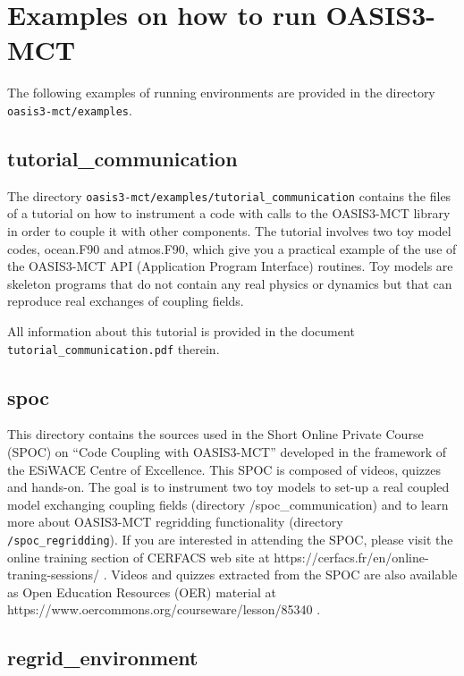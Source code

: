 \section{Examples on how to run OASIS3-MCT}
\label{subsec_running}

The following examples of running environments are provided in the directory {\tt oasis3-mct/examples}.

\subsection{tutorial\_communication}
\label{subsec_tutorial}

The directory  {\tt oasis3-mct/examples/tutorial\_communication}
contains the files of a tutorial on how to instrument a code with calls to the OASIS3-MCT library in order to couple it with other components. The tutorial involves two toy model codes, ocean.F90 and atmos.F90, which give you a practical example of the use of the OASIS3-MCT API (Application Program Interface) routines. Toy models are skeleton programs that do not contain any real physics or dynamics but that can reproduce real exchanges of coupling fields.

All information about this tutorial is
provided in the document {\tt tutorial\_communication.pdf} therein. 

\subsection{spoc}
\label{subsec_spoc}

This directory contains the sources used in the Short Online Private
Course (SPOC) on “Code Coupling with OASIS3-MCT” developed in the
framework of the ESiWACE Centre of Excellence. This SPOC is composed
of videos, quizzes and hands-on. The goal is to instrument two toy
models to set-up a real coupled model exchanging coupling fields (directory
  /spoc\_communication) and to learn more about OASIS3-MCT regridding
functionality (directory {\tt /spoc\_regridding}). If you are interested in
attending the SPOC, please visit the online training section of
CERFACS web site at https://cerfacs.fr/en/online-traning-sessions/ .
Videos and quizzes extracted from the SPOC are also available
as Open Education Resources (OER) material at https://www.oercommons.org/courseware/lesson/85340 .

\subsection{regrid\_environment}
\label{subsec_regrid}

